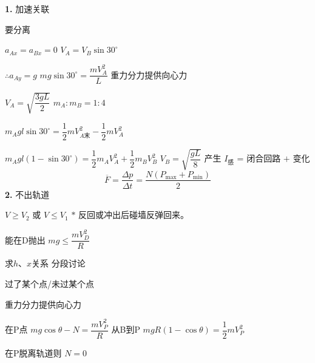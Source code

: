 \textbf{1.} 加速关联

要分离

$a_{Ax}=a_{Bx}=0$ \qquad $V_A=V_B\sin30^\circ$ %

$\therefore a_{Ay}=g$ \qquad $mg\sin30^\circ=\dfrac{mV_A^{2}}{L}$ 重力分力提供向心力

$V_A=\sqrt{\dfrac{3gL}{2}}$ \qquad $m_A:m_B=1:4$ %

$m_Agl\sin30^\circ=\dfrac12 mV_{A\text{末}}^{2}-\dfrac12 mV_A^{2}$ %

$m_Agl(1-\sin30^\circ)=\dfrac12 m_AV_A^{2}+\dfrac12 m_BV_B^{2}$ \qquad $V_B=\sqrt{\dfrac{gL}{8}}$
产生 $I_{\text{感}}$ = 闭合回路 $+$ 变化 %
\[ \overline{F}=\frac{\Delta p}{\Delta t}=\frac{N(P_{\max}+P_{\min})}{2} \] %
\textbf{2.} 不出轨道

$V\ge V_2$ 或 $V\le V_1$ \qquad $\ast$ 反回或冲出后碰墙反弹回来。

能在D抛出 \quad $mg\le\dfrac{mV_D^{2}}{R}$

求$h$、$x$关系 分段讨论

过了某个点/未过某个点

重力分力提供向心力

在P点 $mg\cos\theta-N=\dfrac{mV_P^{2}}{R}$ \qquad 从B到P $mgR(1-\cos\theta)=\dfrac12 mV_P^{2}$

在P脱离轨道则 $N=0$

